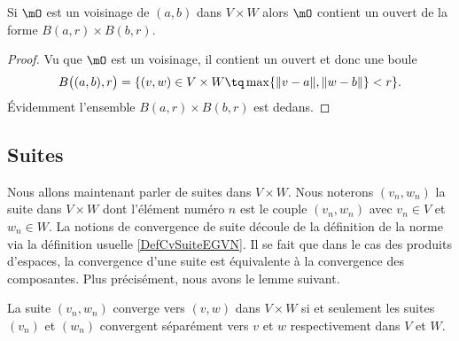 \begin{proposition} \label{PropDXR_KbaLC}
    Si \( \mO\) est un voisinage de \( (a,b)\) dans \( V\times W\) alors \( \mO\) contient un ouvert de la forme \( B(a,r)\times B(b,r)\).
\end{proposition}

\begin{proof}
    Vu que \( \mO\) est un voisinage, il contient un ouvert et donc une boule
    \begin{equation}
        B\big( (a,b),r \big)=\{ (v,w)\in V\times W\tq \max\{ \| v-a \|,\| w-b \| \}< r \}.
    \end{equation}
    Évidemment l'ensemble \( B(a,r)\times B(b,r)\) est dedans.
\end{proof}

\subsection{Suites}

Nous allons maintenant parler de suites dans $V\times W$. Nous noterons $(v_n,w_n)$ la suite dans $V\times W$ dont l'élément numéro $n$ est le couple $(v_n,w_n)$ avec $v_n\in V$ et $w_n\in W$. La notions de convergence de suite découle de la définition de la norme via la définition usuelle \ref{DefCvSuiteEGVN}. Il se fait que dans le cas des produits d'espaces, la convergence d'une suite est équivalente à la convergence des composantes. Plus précisément, nous avons le lemme suivant.
\begin{lemma}		\label{LemCvVxWcvVW}
	La suite $(v_n,w_n)$ converge vers $(v,w)$ dans $V\times W$ si et seulement les suites $(v_n)$ et $(w_n)$ convergent séparément vers $v$ et $w$ respectivement dans $V$ et $W$. 
\end{lemma}


